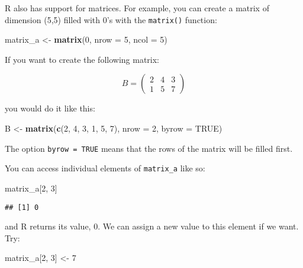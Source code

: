 \documentclass[
]{article}
\newenvironment{Shaded}{\begin{snugshade}}{\end{snugshade}}
\newcommand{\DataTypeTok}[1]{\textcolor[rgb]{0.13,0.29,0.53}{#1}}
\newcommand{\DecValTok}[1]{\textcolor[rgb]{0.00,0.00,0.81}{#1}}
\newcommand{\KeywordTok}[1]{\textcolor[rgb]{0.13,0.29,0.53}{\textbf{#1}}}
\newcommand{\NormalTok}[1]{#1}
\newcommand{\OtherTok}[1]{\textcolor[rgb]{0.56,0.35,0.01}{#1}}
\newcommand{\StringTok}[1]{\textcolor[rgb]{0.31,0.60,0.02}{#1}}
\begin{document}
R also has support for matrices. For example, you can create a matrix of dimension (5,5) filled
with 0's with the \texttt{matrix()} function:

\begin{Shaded}
\begin{Highlighting}[]
\NormalTok{matrix\_a \textless{}{-}}\StringTok{ }\KeywordTok{matrix}\NormalTok{(}\DecValTok{0}\NormalTok{, }\DataTypeTok{nrow =} \DecValTok{5}\NormalTok{, }\DataTypeTok{ncol =} \DecValTok{5}\NormalTok{)}
\end{Highlighting}
\end{Shaded}

If you want to create the following matrix:

\[
B = \left(
\begin{array}{ccc}
 2 & 4 & 3 \\
 1 & 5 & 7
\end{array} \right)
\]

you would do it like this:

\begin{Shaded}
\begin{Highlighting}[]
\NormalTok{B \textless{}{-}}\StringTok{ }\KeywordTok{matrix}\NormalTok{(}\KeywordTok{c}\NormalTok{(}\DecValTok{2}\NormalTok{, }\DecValTok{4}\NormalTok{, }\DecValTok{3}\NormalTok{, }\DecValTok{1}\NormalTok{, }\DecValTok{5}\NormalTok{, }\DecValTok{7}\NormalTok{), }\DataTypeTok{nrow =} \DecValTok{2}\NormalTok{, }\DataTypeTok{byrow =} \OtherTok{TRUE}\NormalTok{)}
\end{Highlighting}
\end{Shaded}

The option \texttt{byrow\ =\ TRUE} means that the rows of the matrix will be filled first.

You can access individual elements of \texttt{matrix\_a} like so:

\begin{Shaded}
\begin{Highlighting}[]
\NormalTok{matrix\_a[}\DecValTok{2}\NormalTok{, }\DecValTok{3}\NormalTok{]}
\end{Highlighting}
\end{Shaded}

\begin{verbatim}
## [1] 0
\end{verbatim}

and R returns its value, 0. We can assign a new value to this element if we want. Try:

\begin{Shaded}
\begin{Highlighting}[]
\NormalTok{matrix\_a[}\DecValTok{2}\NormalTok{, }\DecValTok{3}\NormalTok{] \textless{}{-}}\StringTok{ }\DecValTok{7}
\end{Highlighting}
\end{Shaded}
\end{document}

